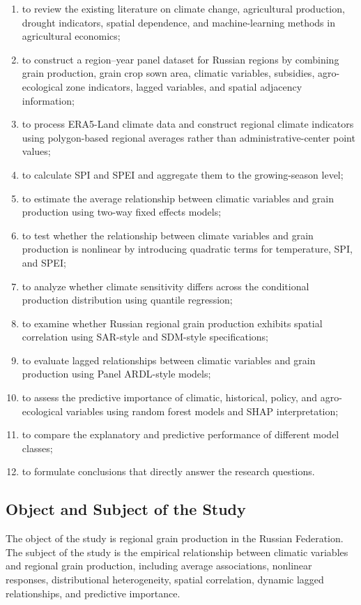 \documentclass[12pt,a4paper]{article}
\begin{document}
\begin{enumerate}
    \item to review the existing literature on climate change, agricultural production, drought indicators, spatial dependence, and machine-learning methods in agricultural economics;
    \item to construct a region--year panel dataset for Russian regions by combining grain production, grain crop sown area, climatic variables, subsidies, agro-ecological zone indicators, lagged variables, and spatial adjacency information;
    \item to process ERA5-Land climate data and construct regional climate indicators using polygon-based regional averages rather than administrative-center point values;
    \item to calculate SPI and SPEI and aggregate them to the growing-season level;
    \item to estimate the average relationship between climatic variables and grain production using two-way fixed effects models;
    \item to test whether the relationship between climate variables and grain production is nonlinear by introducing quadratic terms for temperature, SPI, and SPEI;
    \item to analyze whether climate sensitivity differs across the conditional production distribution using quantile regression;
    \item to examine whether Russian regional grain production exhibits spatial correlation using SAR-style and SDM-style specifications;
    \item to evaluate lagged relationships between climatic variables and grain production using Panel ARDL-style models;
    \item to assess the predictive importance of climatic, historical, policy, and agro-ecological variables using random forest models and SHAP interpretation;
    \item to compare the explanatory and predictive performance of different model classes;
    \item to formulate conclusions that directly answer the research questions.
\end{enumerate}

\subsection{Object and Subject of the Study}

The object of the study is regional grain production in the Russian Federation. The subject of the study is the empirical relationship between climatic variables and regional grain production, including average associations, nonlinear responses, distributional heterogeneity, spatial correlation, dynamic lagged relationships, and predictive importance.
\end{document}

